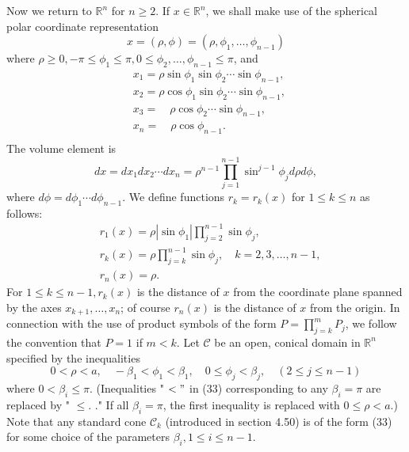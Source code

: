 \begin{para}
  Now we return to $\mathbb{R}^n$ for $n \geq 2$. If $x \in \mathbb{R}^n$, we shall make use of the spherical polar coordinate representation
  \[
  x=(\rho, \phi)=\left(\rho, \phi_1, \ldots, \phi_{n-1}\right)
  \]
  where $\rho \geq 0,-\pi \leq \phi_1 \leq \pi, 0 \leq \phi_2, \ldots, \phi_{n-1} \leq \pi$, and
  \[
  \begin{aligned}
  & x_1=\rho \sin \phi_1 \sin \phi_2 \cdots \sin \phi_{n-1}, \\
  & x_2=\rho \cos \phi_1 \sin \phi_2 \cdots \sin \phi_{n-1} \text {, } \\
  & x_3=\quad \rho \cos \phi_2 \cdots \sin \phi_{n-1} \text {, } \\
  & x_n=\quad \rho \cos \phi_{n-1} \text {. } \\
  &
  \end{aligned}
  \]
  The volume element is
  \[
  d x=d x_1 d x_2 \cdots d x_n=\rho^{n-1} \prod_{j=1}^{n-1} \sin ^{j-1} \phi_j d \rho d \phi,
  \]
  where $d \phi=d \phi_1 \cdots d \phi_{n-1}$.
  We define functions $r_k=r_k(x)$ for $1 \leq k \leq n$ as follows:
  \[
  \begin{aligned}
  & r_1(x)=\rho\left|\sin \phi_1\right| \prod_{j=2}^{n-1} \sin \phi_j, \\
  & r_k(x)=\rho \prod_{j=k}^{n-1} \sin \phi_j, \quad k=2,3, \ldots, n-1, \\
  & r_n(x)=\rho .
  \end{aligned}
  \]
  For $1 \leq k \leq n-1, r_k(x)$ is the distance of $x$ from the coordinate plane spanned by the axes $x_{k+1}, \ldots, x_n$; of course $r_n(x)$ is the distance of $x$ from the origin. In connection with the use of product symbols of the form $P=\prod_{j=k}^m P_j$, we follow the convention that $P=1$ if $m<k$.
  Let $\mathcal{C}$ be an open, conical domain in $\mathbb{R}^n$ specified by the inequalities
  \[
  0<\rho<a, \quad-\beta_1<\phi_1<\beta_1, \quad 0 \leq \phi_j<\beta_j, \quad(2 \leq j \leq n-1)
  \]
  where $0<\beta_i \leq \pi$. (Inequalities " $<"$ in (33) corresponding to any $\beta_i=\pi$ are replaced by " $\leq$. ." If all $\beta_i=\pi$, the first inequality is replaced with $0 \leq \rho<a$.) Note that any standard cone $\mathcal{C}_k$ (introduced in section 4.50) is of the form (33) for some choice of the parameters $\beta_i, 1 \leq i \leq n-1$.
\end{para}


